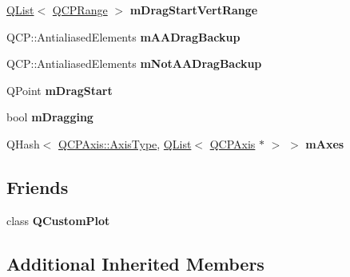 \begin{DoxyCompactItemize}
\item 
\hyperlink{class_q_list}{Q\+List}$<$ \hyperlink{class_q_c_p_range}{Q\+C\+P\+Range} $>$ {\bfseries m\+Drag\+Start\+Vert\+Range}\hypertarget{class_q_c_p_axis_rect_a39719450bcd611c455763e650a81af52}{}\label{class_q_c_p_axis_rect_a39719450bcd611c455763e650a81af52}

\item 
Q\+C\+P\+::\+Antialiased\+Elements {\bfseries m\+A\+A\+Drag\+Backup}\hypertarget{class_q_c_p_axis_rect_aa4a24f76360cfebe1bcf17a77fa7521b}{}\label{class_q_c_p_axis_rect_aa4a24f76360cfebe1bcf17a77fa7521b}

\item 
Q\+C\+P\+::\+Antialiased\+Elements {\bfseries m\+Not\+A\+A\+Drag\+Backup}\hypertarget{class_q_c_p_axis_rect_a6fcb12e052e276d57efbb128be31d6f5}{}\label{class_q_c_p_axis_rect_a6fcb12e052e276d57efbb128be31d6f5}

\item 
Q\+Point {\bfseries m\+Drag\+Start}\hypertarget{class_q_c_p_axis_rect_a032896b28f83a58010d8d533b78c49df}{}\label{class_q_c_p_axis_rect_a032896b28f83a58010d8d533b78c49df}

\item 
bool {\bfseries m\+Dragging}\hypertarget{class_q_c_p_axis_rect_ab49a6698194cf0e9e38a1d734c0888a8}{}\label{class_q_c_p_axis_rect_ab49a6698194cf0e9e38a1d734c0888a8}

\item 
Q\+Hash$<$ \hyperlink{class_q_c_p_axis_ae2bcc1728b382f10f064612b368bc18a}{Q\+C\+P\+Axis\+::\+Axis\+Type}, \hyperlink{class_q_list}{Q\+List}$<$ \hyperlink{class_q_c_p_axis}{Q\+C\+P\+Axis} $\ast$ $>$ $>$ {\bfseries m\+Axes}\hypertarget{class_q_c_p_axis_rect_ad51b376756280ee85c0ca367437fda7c}{}\label{class_q_c_p_axis_rect_ad51b376756280ee85c0ca367437fda7c}

\end{DoxyCompactItemize}
\subsection*{Friends}
\begin{DoxyCompactItemize}
\item 
class {\bfseries Q\+Custom\+Plot}\hypertarget{class_q_c_p_axis_rect_a00f8b42d059625f815808a7cc99c2f04}{}\label{class_q_c_p_axis_rect_a00f8b42d059625f815808a7cc99c2f04}

\end{DoxyCompactItemize}
\subsection*{Additional Inherited Members}


